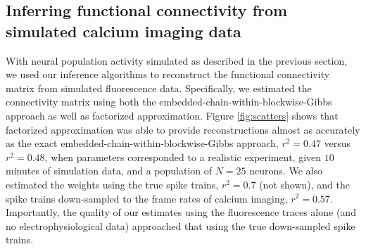 \subsection{Inferring functional connectivity from simulated calcium imaging data} \label{sec:results:inference}

With neural population activity simulated as described in the previous section, we used our inference algorithms to reconstruct the functional connectivity matrix from simulated fluorescence data. Specifically, we estimated the connectivity matrix using both the embedded-chain-within-blockwise-Gibbs approach as well as factorized approximation. Figure \ref{fig:scatters} shows that factorized approximation was able to provide reconstructions almost as accurately as the exact embedded-chain-within-blockwise-Gibbs approach, $r^2=0.47$ versus $r^2=0.48$, when parameters corresponded to a realistic experiment, given $10$ minutes of simulation data, and a population of $N=25$ neurons. We also estimated the weights using the true spike trains, $r^2=0.7$ (not shown), and the spike trains down-sampled to the frame rates of calcium imaging, $r^2=0.57$. Importantly, the quality of our estimates using the fluorescence traces alone (and no electrophysiological data) approached that using the true down-sampled spike trains.  

